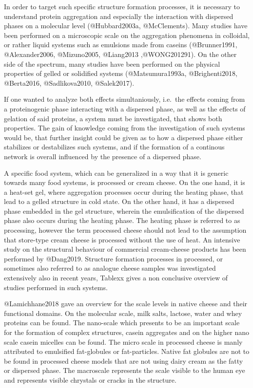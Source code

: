 \documentclass[
]{article}
\begin{document}
In order to target such specific structure formation processes, it is
necessary to understand protein aggregation and especially the
interaction with dispersed phases on a molecular level (@Hubbard2003a,
@McClements). Many studies have been performed on a microscopic scale on
the aggregation phenomena in colloidal, or rather liquid systems such as
emulsions made from caseins (@Brunner1991, @Alexander2006, @Mizuno2005,
@Liang2013 ,@WONG201291). On the other side of the spectrum, many
studies have been performed on the physical properties of gelled or
solidified systems (@Matsumura1993a, @Brighenti2018, @Berta2016,
@Sadlikova2010, @Salek2017).

If one wanted to analyze both effects simultaniously, i.e.~the effects
coming from a proteinogenic phase interacting with a dispersed phase, as
well as the effects of gelation of said proteins, a system must be
investigated, that shows both properties. The gain of knowledge coming
from the investigation of such systems would be, that further insight
could be given as to how a dispersed phase either stabilizes or
destabilizes such systems, and if the formation of a continous network
is overall influenced by the presence of a dispersed phase.

A specific food system, which can be generalized in a way that it is
generic towards many food systems, is processed or cream cheese. On the
one hand, it is a heat-set gel, where aggregation processes occur during
the heating phase, that lead to a gelled structure in cold state. On the
other hand, it has a dispersed phase embedded in the gel structure,
wherein the emulsification of the dispersed phase also occurs during the
heating phase. The heating phase is referred to as processing, however
the term processed cheese should not lead to the assumption that
store-type cream cheese is processed without the use of heat. An
intensive study on the structural behaviour of commercial cream-cheese
products has been performed by @Dang2019. Structure formation processes
in processed, or sometimes also referred to as analogue cheese samples
was investigated extensively also in recent years, Tablexx gives a non
conclusive overview of studies performed in such systems.

@Lamichhane2018 gave an overview for the scale levels in native cheese
and their functional domains. On the molecular scale, milk salts,
lactose, water and whey proteins can be found. The nano-scale which
presents to be an important scale for the formation of complex
structures, casein aggregates and on the higher nano scale casein
micelles can be found. The micro scale in processed cheese is manly
attributed to emulsified fat-globules or fat-particles. Native fat
globules are not to be found in processed cheese models that are not
using dairy cream as the fatty or dispersed phase. The macroscale
represents the scale visible to the human eye and represents visible
chrystals or cracks in the structure.
\end{document}
